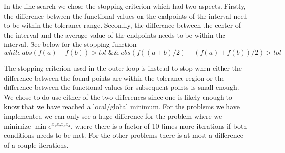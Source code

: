 In the line search we chose the stopping criterion which had two aspects. Firstly, the difference between the functional values on the endpoints of the interval need to be within the tolerance range. Secondly, the difference between the center of the interval and the average value of the endpoints needs to be within the interval. See below for the stopping function
$$ while\; abs(f(a)-f(b)) > tol\; \&\&\;abs(f((a+b)/2)-(f(a)+f(b))/2) > tol$$

The stopping criterion used in the outer loop is instead to stop when either the difference between the found points are within the tolerance region or the difference between the functional values for subsequent points is small enough. We chose to do use either of the two differences since one is likely enough to know that we have reached a local/global minimum. For the problems we have implemented we can only see a huge difference for the problem where we minimize $\min e^{x_1 x_2 x_3 x_4} $, where there is a factor of 10 times more iterations if both conditions needs to be met. For the other problems there is at most a difference of a couple iterations.